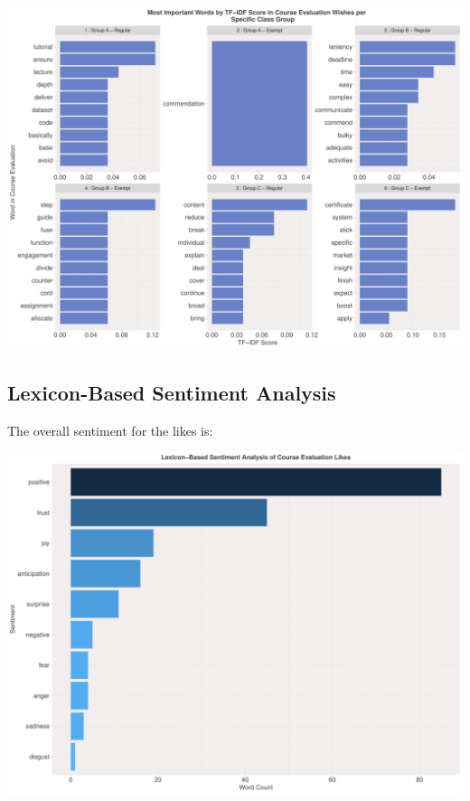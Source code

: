 \documentclass[
]{article}
\begin{document}
\includegraphics{AnalysisOfCourseEvaluation-Notebook_files/figure-latex/TF-IDFWishesPerGroup-1.pdf}

\newpage

\subsection{Lexicon-Based Sentiment
Analysis}\label{lexicon-based-sentiment-analysis}

The overall sentiment for the likes is:

\includegraphics{AnalysisOfCourseEvaluation-Notebook_files/figure-latex/OverallSentimentForLikes-1.pdf}

\newpage
\end{document}
